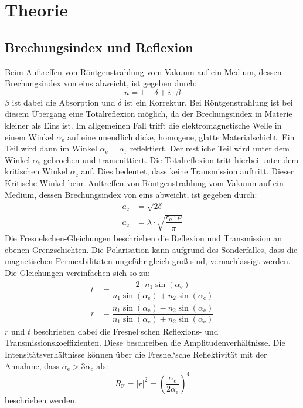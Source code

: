 
\section{Theorie}
\label{sec:Theorie}
\subsection{Brechungsindex und Reflexion}
\label{sec:Brechungsindex}
Beim Auftreffen von Röntgenstrahlung vom Vakuum auf ein Medium, dessen Brechungsindex von eins abweicht, ist gegeben durch:
\begin{equation}
  \label{eqn:Brechungsindex}
  n=1-\delta+ i\cdot \beta
\end{equation}
$\beta$ ist dabei die Absorption und $\delta$ ist ein Korrektur. Bei Röntgenstrahlung ist bei diesem Übergang eine Totalreflexion möglich, da der Brechungsindex in Materie kleiner als Eins ist. Im allgemeinen Fall trifft die elektromagnetische Welle in einem Winkel $\alpha_\mathrm{e}$ auf eine unendlich dicke, homogene, glatte Materialschicht. Ein Teil wird dann im Winkel $\alpha_\mathrm{e}=\alpha_\mathrm{r}$ reflektiert. Der restliche Teil wird unter dem Winkel $\alpha_\mathrm{t}$ gebrochen und transmittiert. Die Totalreflexion tritt hierbei unter dem kritischen Winkel $\alpha_\mathrm{c}$ auf. Dies bedeutet, dass keine Transmission auftritt. Dieser Kritische Winkel beim Auftreffen von Röntgenstrahlung vom Vakuum auf ein Medium, dessen Brechungsindex von eins abweicht, ist gegeben durch:
\begin{align}
  \label{eqn:Totalreflexion}
  a_\mathrm{c} &= \sqrt{2 \delta} \\
  a_\mathrm{c} &= \lambda\cdot\sqrt{\dfrac{r_\mathrm{e}\cdot\rho}{\pi}}
\end{align}
Die Fresnelschen-Gleichungen beschrieben die Reflexion und Transmission an ebenen Grenzschichten. Die Polarisation kann aufgrund des Sonderfalles, dass die magnetischen Permeabilitäten ungefähr gleich groß sind, vernachlässigt werden. Die Gleichungen vereinfachen sich so zu:
\begin{align}
  \label{eqn:Fresnelschen-Gleichungenl}
  t &= \dfrac{2\cdot n_\mathrm{1} \sin(\alpha_\mathrm{e}) }{n_\mathrm{1} \sin(\alpha_\mathrm{e})+ n_\mathrm{2} \sin(\alpha_\mathrm{c})}\\
  r &= \dfrac{n_\mathrm{1} \sin(\alpha_\mathrm{e})-n_\mathrm{2}\sin(\alpha_\mathrm{c})}{n_\mathrm{1}\sin(\alpha_\mathrm{e})+n_\mathrm{2} \sin(\alpha_\mathrm{c})}
\end{align}
$r$ und $t$ beschrieben dabei die Fresnel`schen Reflexions- und Transmissionskoeffizienten. Diese beschreiben die Amplitudenverhältnisse. Die Intensitätsverhältnisse können über die Fresnel`sche Reflektivität mit der Annahme, dass $\alpha_\mathrm{e} >3 \alpha_\mathrm{c}$ als:
\begin{equation}
  \label{eqn:Fresnelref}
 R_\mathrm{F} =|r|^2 =\left(\dfrac{\alpha_\mathrm{c}}{2\alpha_\mathrm{e}}\right)^4
\end{equation}
beschrieben werden.
